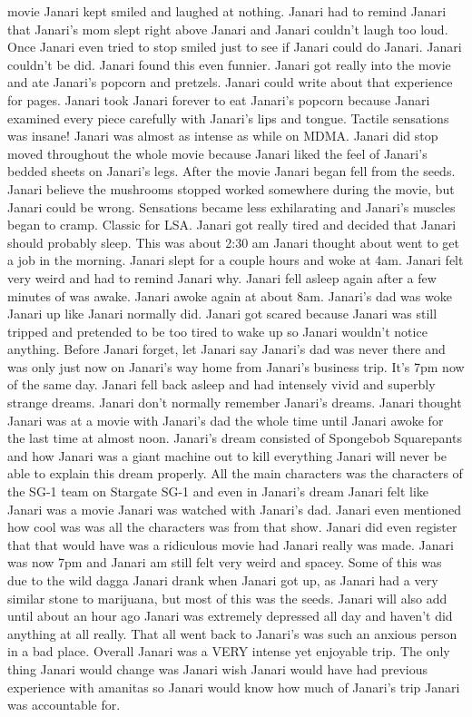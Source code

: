 \documentclass[12pt]{book}
\begin{document}
movie Janari kept smiled and laughed at nothing. Janari had to remind Janari that Janari's mom slept right above Janari and Janari couldn't laugh too loud. Once Janari even tried to stop smiled just to see if Janari could do Janari. Janari couldn't be did. Janari found this even funnier. Janari got really into the movie and ate Janari's popcorn and pretzels. Janari could write about that experience for pages. Janari took Janari forever to eat Janari's popcorn because Janari examined every piece carefully with Janari's lips and tongue. Tactile sensations was insane! Janari was almost as intense as while on MDMA. Janari did stop moved throughout the whole movie because Janari liked the feel of Janari's bedded sheets on Janari's legs. After the movie Janari began fell from the seeds. Janari believe the mushrooms stopped worked somewhere during the movie, but Janari could be wrong. Sensations became less exhilarating and Janari's muscles began to cramp. Classic for LSA. Janari got really tired and decided that Janari should probably sleep. This was about 2:30 am Janari thought about went to get a job in the morning. Janari slept for a couple hours and woke at 4am. Janari felt very weird and had to remind Janari why. Janari fell asleep again after a few minutes of was awake. Janari awoke again at about 8am. Janari's dad was woke Janari up like Janari normally did. Janari got scared because Janari was still tripped and pretended to be too tired to wake up so Janari wouldn't notice anything. Before Janari forget, let Janari say Janari's dad was never there and was only just now on Janari's way home from Janari's business trip. It's 7pm now of the same day. Janari fell back asleep and had intensely vivid and superbly strange dreams. Janari don't normally remember Janari's dreams. Janari thought Janari was at a movie with Janari's dad the whole time until Janari awoke for the last time at almost noon. Janari's dream consisted of Spongebob Squarepants and how Janari was a giant machine out to kill everything Janari will never be able to explain this dream properly. All the main characters was the characters of the SG-1 team on Stargate SG-1 and even in Janari's dream Janari felt like Janari was a movie Janari was watched with Janari's dad. Janari even mentioned how cool was was all the characters was from that show. Janari did even register that that would have was a ridiculous movie had Janari really was made. Janari was now 7pm and Janari am still felt very weird and spacey. Some of this was due to the wild dagga Janari drank when Janari got up, as Janari had a very similar stone to marijuana, but most of this was the seeds. Janari will also add until about an hour ago Janari was extremely depressed all day and haven't did anything at all really. That all went back to Janari's was such an anxious person in a bad place. Overall Janari was a VERY intense yet enjoyable trip. The only thing Janari would change was Janari wish Janari would have had previous experience with amanitas so Janari would know how much of Janari's trip Janari was accountable for.
\end{document}
